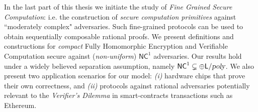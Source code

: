 	
  In the last part of this thesis we initiate the study of {\em Fine Grained Secure Computation}: i.e. 
  the construction of {\em secure computation primitives} against ``moderately complex" adversaries. Such fine-grained protocols can be used to obtain sequentially composable rational proofs. We present definitions and constructions for \textit{compact} Fully Homomorphic Encryption and Verifiable Computation secure against (\textit{non-uniform}) $\mathsf{NC}^1$ adversaries. Our results hold under a widely believed separation assumption, namely ${\mathsf{NC}}^1 \subsetneq \oplus {\ensuremath{\mathsf{L}}} / {\textsl{poly}}$. We also present two application scenarios for our model: \textit{(i)} hardware chips that prove their own correctness, and \textit{(ii)} protocols against rational adversaries potentially relevant to the {\em Verifier's Dilemma} in smart-contracts transactions such as Ethereum. 
